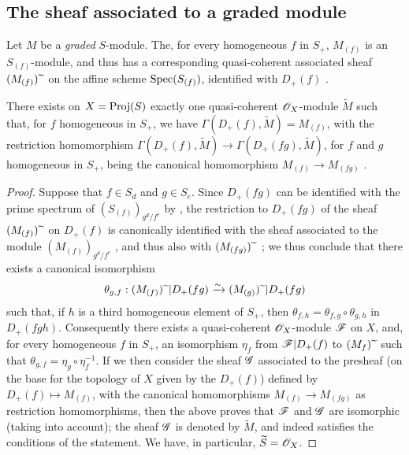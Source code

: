 \subsection{The sheaf associated to a graded module}
\label{subsection:II.2.5}

\begin{env}[2.5.1]
\label{II.2.5.1}
Let $M$ be a \emph{graded} $S$-module.
The, for every homogeneous $f$ in $S_+$, $M_{(f)}$ is an $S_{(f)}$-module, and thus has a corresponding quasi-coherent associated sheaf $(M_{(f)}){\,\widetilde{\,}\,}$ on the affine scheme $\operatorname{Spec}(S_{(f)})$, identified with $D_+(f)$ .
\end{env}

\begin{proposition}[2.5.2]
\label{II.2.5.2}
There exists on $X=\operatorname{Proj}(S)$ exactly one quasi-coherent $\mathscr{O}_X$-module $\widetilde{M}$ such that, for $f$ homogeneous in $S_+$, we have $\Gamma(D_+(f),\widetilde{M})=M_{(f)}$, with the restriction homomorphism $\Gamma(D_+(f),\widetilde{M})\to\Gamma(D_+(fg),\widetilde{M})$, for $f$ and $g$ homogeneous in $S_+$, being the canonical homomorphism $M_{(f)}\to M_{(fg)}$ .
\end{proposition}

\begin{proof}
Suppose that $f\in S_d$ and $g\in S_e$.
Since $D_+(fg)$ can be identified with the prime spectrum of $(S_{(f)})_{g^d/f^e}$ by , the restriction to $D_+(fg)$ of the sheaf $(M_{(f)}){\,\widetilde{\,}\,}$ on $D_+(f)$ is canonically identified with the sheaf associated to the module $(M_{(f)})_{g^d/f^e}$ , and thus also with $(M_{(fg)}){\,\widetilde{\,}\,}$ ;
we thus conclude that there exists a canonical isomorphism
\[
  \theta_{g,f}: (M_{(f)}){\,\widetilde{\,}\,}|D_+(fg) \xrightarrow{\sim} (M_{(g)}){\,\widetilde{\,}\,}|D_+(fg)
\]
such that, if $h$ is a third homogeneous element of $S_+$, then $\theta_{f,h}=\theta_{f,g}\circ\theta_{g,h}$ in $D_+(fgh)$.
Consequently  there exists a quasi-coherent $\mathscr{O}_X$-module $\mathscr{F}$ on $X$, and, for every homogeneous $f$ in $S_+$, an isomorphism $\eta_f$ from $\mathscr{F}|D_+(f)$ to $(M_{f}){\,\widetilde{\,}\,}$ such that $\theta_{g,f}=\eta_g\circ\eta_f^{-1}$.
If we then consider the sheaf $\mathscr{G}$ associated to the presheaf (on the base for the topology of $X$ given by the $D_+(f)$) defined by $D_+(f)\mapsto M_{(f)}$, with the canonical homomorphisms $M_{(f)}\to M_{(fg)}$ as restriction homomorphisms, then the above proves that $\mathscr{F}$ and $\mathscr{G}$ are isomorphic (taking  into account);
the sheaf $\mathscr{G}$ is denoted by $\widetilde{M}$, and indeed satisfies the conditions of the statement.
We have, in particular, $\widetilde{S}=\mathscr{O}_X$.
\end{proof}

